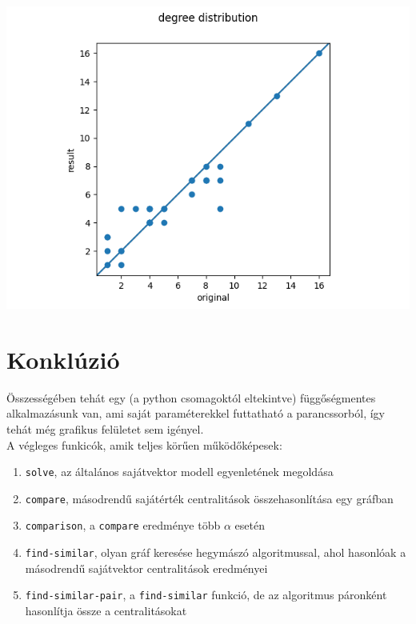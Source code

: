 \documentclass[12pt,numbers=noenddot]{report}
\begin{document}
\hspace{0.5cm}

\includegraphics[width=0.8\linewidth]{images/find_similar_scatterplot2.png}





\chapter{Konklúzió}

Összességében tehát egy (a python csomagoktól eltekintve) függőségmentes 
alkalmazásunk van, ami saját paraméterekkel futtatható a parancssorból, 
így tehát még grafikus felületet sem igényel.\\


\noindent
A végleges funkicók, amik teljes körűen működőképesek:
\begin{enumerate}
	\item \texttt{solve}, az általános sajátvektor modell egyenletének megoldása
	\item \texttt{compare}, másodrendű sajátérték centralitások összehasonlítása egy gráfban
	\item \texttt{comparison}, a \texttt{compare} eredménye több $\alpha$ esetén
	\item \texttt{find-similar}, olyan gráf keresése hegymászó algoritmussal, ahol hasonlóak a másodrendű sajátvektor centralitások eredményei
	\item \texttt{find-similar-pair}, a \texttt{find-similar} funkció, de az algoritmus páronként hasonlítja össze a centralitásokat
\end{enumerate}
\end{document}
